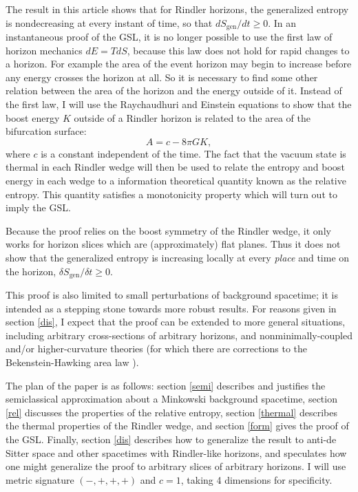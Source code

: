 \documentclass[12pt]{article}
\begin{document}
The result in this article shows that for Rindler horizons, the generalized entropy is nondecreasing at every instant of time, so that $d S_\mathrm{gen} / dt \ge 0$.  In an instantaneous proof of the GSL, it is no longer possible to use the first law of horizon mechanics $dE = T dS$, because this law does not hold for rapid changes to a horizon.  For example the area of the event horizon may begin to increase before any energy crosses the horizon at all.  So it is necessary to find some other relation between the area of the horizon and the energy outside of it.  Instead of the first law, I will use the Raychaudhuri and Einstein equations to show that the boost energy $K$ outside of a Rindler horizon is related to the area of the bifurcation surface:
\begin{equation}\label{AK}
A = c - 8\pi G K,
\end{equation}
where $c$ is a constant independent of the time.  The fact that the vacuum state is thermal in each Rindler wedge will then be used to relate the entropy and boost energy in each wedge to a information theoretical quantity known as the relative entropy.  This quantity satisfies a monotonicity property which will turn out to imply the GSL.

Because the proof relies on the boost symmetry of the Rindler wedge, it only works for horizon slices which are (approximately) flat planes.  Thus it does not show that the generalized entropy is increasing locally at every \emph{place} and time on the horizon, $\delta S_\mathrm{gen} / \delta t \ge 0$.

This proof is also limited to small perturbations of background spacetime; it is intended as a stepping stone towards more robust results.  For reasons given in section \ref{dis}, I expect that the proof can be extended to more general situations, including arbitrary cross-sections of arbitrary horizons, and nonminimally-coupled and/or higher-curvature theories (for which there are corrections to the Bekenstein-Hawking area law \cite{WI94}).

The plan of the paper is as follows: section \ref{semi} describes and justifies the semiclassical approximation about a Minkowski background spacetime, section \ref{rel} discusses the properties of the relative entropy, section \ref{thermal} describes the thermal properties of the Rindler wedge, and section \ref{form} gives the proof of the GSL.  Finally, section \ref{dis} describes how to generalize the result to anti-de Sitter space and other spacetimes with Rindler-like horizons, and speculates how one might generalize the proof to arbitrary slices of arbitrary horizons.  I will use metric signature $(-,+,+,+)$ and $c = 1$, taking 4 dimensions for specificity.
\end{document}
